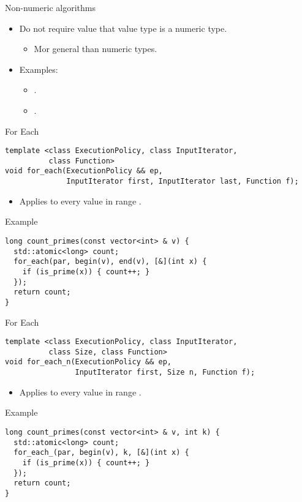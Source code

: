 \begin{frame}[t]{Non-numeric algorithms}
\begin{itemize}
  \item Do not require value that value type is a numeric type.
    \begin{itemize}
      \item Mor general than numeric types.
    \end{itemize}
  \item Examples:
    \begin{itemize}
      \item {}.
      \item {}.
    \end{itemize}
\end{itemize}
\end{frame}

\begin{frame}[t,fragile]{For Each}
\begin{lstlisting}[]
template <class ExecutionPolicy, class InputIterator, 
          class Function>
void for_each(ExecutionPolicy && ep, 
              InputIterator first, InputIterator last, Function f);
\end{lstlisting}
\begin{itemize}
  \item Applies  to every value in range \cppid{[first,last)}.
\end{itemize}
\begin{block}{Example}
\begin{lstlisting}[basicstyle=\scriptsize]
long count_primes(const vector<int> & v) {
  std::atomic<long> count;
  for_each(par, begin(v), end(v), [&](int x) {
    if (is_prime(x)) { count++; }
  });
  return count;
}
\end{lstlisting}
\end{block}
\end{frame}

\begin{frame}[t,fragile]{For Each}
\begin{lstlisting}[]
template <class ExecutionPolicy, class InputIterator, 
          class Size, class Function>
void for_each_n(ExecutionPolicy && ep, 
                InputIterator first, Size n, Function f);
\end{lstlisting}
\begin{itemize}
  \item Applies  to every value in range \cppid{[first,first+n)}.
\end{itemize}
\begin{block}{Example}
\begin{lstlisting}[basicstyle=\scriptsize]
long count_primes(const vector<int> & v, int k) {
  std::atomic<long> count;
  for_each_(par, begin(v), k, [&](int x) {
    if (is_prime(x)) { count++; }
  });
  return count;
}
\end{lstlisting}
\end{block}
\end{frame}

